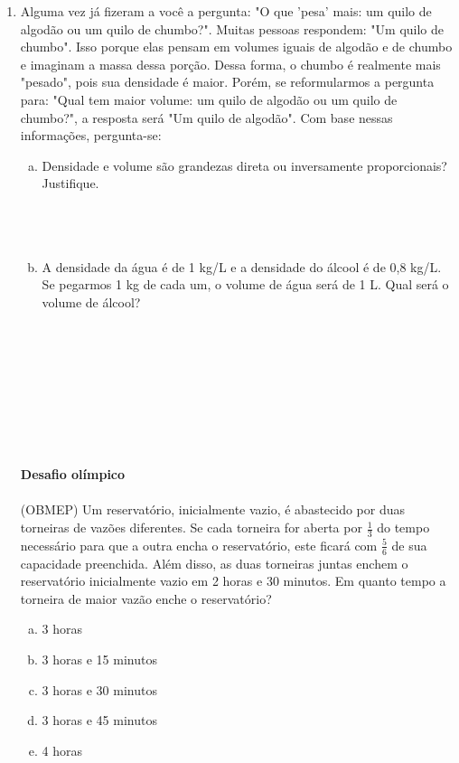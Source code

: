 \documentclass[a4paper,14pt]{article}
\begin{document}
\begin{multicols}{2}
\begin{enumerate}
\begin{enumerate}[a)]
	    	\end{enumerate}	
    		\item Alguma vez já fizeram a você a pergunta: "O que 'pesa' mais: um quilo de algodão ou um quilo de chumbo?". Muitas pessoas respondem: "Um quilo de chumbo". Isso porque elas pensam em volumes iguais de algodão e de chumbo e imaginam a massa dessa porção. Dessa forma, o chumbo é realmente mais "pesado", pois sua densidade é maior. Porém, se reformularmos a pergunta para: "Qual tem maior volume: um quilo de algodão ou um quilo de chumbo?", a resposta será "Um quilo de algodão". Com base nessas informações, pergunta-se:
    		\begin{enumerate}[a)]
    			\item Densidade e volume são grandezas direta ou inversamente proporcionais? Justifique. \\\\\\\\
    			\item A densidade da água é de 1 kg/L e a densidade do álcool é de 0,8 kg/L. Se pegarmos 1 kg de cada um, o volume de água será de 1 L. Qual será o volume de álcool?  \\\\\\\\\\\\\\\\\\
    		\end{enumerate}	
    	    \textbf{Desafio olímpico} \\\\
    	    (OBMEP) Um reservatório, inicialmente vazio, é abastecido por duas torneiras de vazões diferentes. Se cada torneira for aberta por $\frac{1}{3}$ do tempo necessário para que a outra encha o reservatório, este ficará com $\frac{5}{6}$ de sua capacidade preenchida. Além disso, as duas torneiras juntas enchem o reservatório inicialmente vazio em 2 horas e 30 minutos. Em quanto tempo a torneira de maior vazão enche o reservatório?
    	    \begin{enumerate}[a)]
    	    	\item 3 horas
    	    	\item 3 horas e 15 minutos
    	    	\item 3 horas e 30 minutos
    	    	\item 3 horas e 45 minutos
    	    	\item 4 horas \\\\

\end{enumerate}
\end{enumerate}
\end{multicols}
\end{document}
